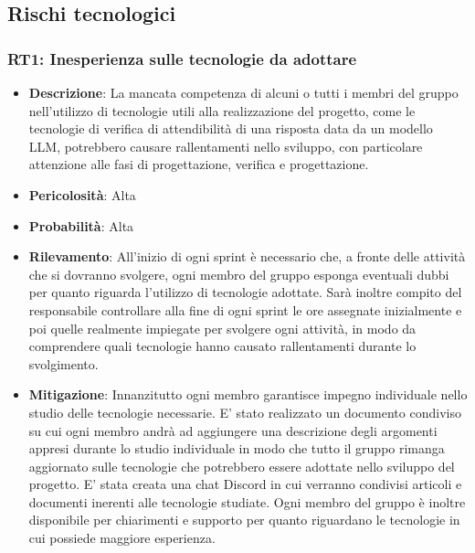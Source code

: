 \documentclass[a4paper, 12pt]{article}
\begin{document}
\subsection{Rischi tecnologici}
\subsubsection{RT1: Inesperienza sulle tecnologie da adottare}
\begin{itemize}
    \item \textbf{Descrizione}: La mancata competenza di alcuni o tutti i membri del gruppo nell'utilizzo di tecnologie utili alla realizzazione del progetto,
    come le tecnologie di verifica di attendibilità di una risposta data da un modello LLM, potrebbero causare rallentamenti nello sviluppo, con particolare
    attenzione alle fasi di progettazione, verifica e progettazione. 
    \item \textbf{Pericolosità}: Alta
    \item \textbf{Probabilità}: Alta
    \item \textbf{Rilevamento}: All'inizio di ogni sprint è necessario che, a fronte delle attività che si dovranno svolgere, ogni membro 
    del gruppo esponga eventuali dubbi per quanto riguarda l'utilizzo di tecnologie adottate. Sarà inoltre compito del responsabile controllare
    alla fine di ogni sprint le ore assegnate inizialmente e poi quelle realmente impiegate per svolgere ogni attività, in modo da comprendere
    quali tecnologie hanno causato rallentamenti durante lo svolgimento.
    \item \textbf{Mitigazione}:  Innanzitutto ogni membro garantisce impegno individuale nello studio delle tecnologie necessarie.
    E' stato realizzato un documento condiviso su cui ogni membro andrà ad aggiungere una descrizione degli argomenti appresi durante lo studio 
    individuale in modo che tutto il gruppo rimanga aggiornato sulle tecnologie che potrebbero essere adottate nello sviluppo del progetto.
    E' stata creata una chat Discord in cui verranno condivisi articoli e documenti inerenti alle tecnologie studiate.
    Ogni membro del gruppo è inoltre disponibile per chiarimenti e supporto per quanto riguardano le tecnologie in cui possiede maggiore esperienza.
\end{itemize}
\end{document}
